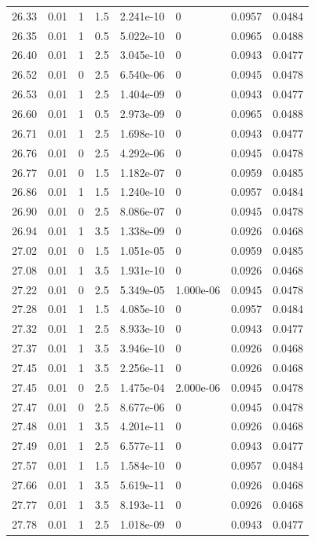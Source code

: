 \documentclass[preview]{standalone}
\begin{document}
{{{{{{{{{{{{\begin{tabular}{L{1.2cm}C{1.2cm} C{0.3cm}C{0.5cm} C{1.4cm}C{1.4cm} C{1.4cm}C{1.4cm}}
  26.33  &  0.01  & 1     & 1.5 &  2.241e-10  & 0  & 0.0957 &  0.0484   \\ 
  26.35  &  0.01  & 1     & 0.5 &  5.022e-10  & 0  & 0.0965 &  0.0488   \\ 
  26.40  &  0.01  & 1     & 2.5 &  3.045e-10  & 0  & 0.0943 &  0.0477   \\ 
  26.52  &  0.01  & 0     & 2.5 &  6.540e-06  & 0  & 0.0945 &  0.0478   \\ 
  26.53  &  0.01  & 1     & 2.5 &  1.404e-09  & 0  & 0.0943 &  0.0477   \\ 
  26.60  &  0.01  & 1     & 0.5 &  2.973e-09  & 0  & 0.0965 &  0.0488   \\ 
  26.71  &  0.01  & 1     & 2.5 &  1.698e-10  & 0  & 0.0943 &  0.0477   \\ 
  26.76  &  0.01  & 0     & 2.5 &  4.292e-06  & 0  & 0.0945 &  0.0478   \\ 
  26.77  &  0.01  & 0     & 1.5 &  1.182e-07  & 0  & 0.0959 &  0.0485   \\ 
  26.86  &  0.01  & 1     & 1.5 &  1.240e-10  & 0  & 0.0957 &  0.0484   \\ 
  26.90  &  0.01  & 0     & 2.5 &  8.086e-07  & 0  & 0.0945 &  0.0478   \\ 
  26.94  &  0.01  & 1     & 3.5 &  1.338e-09  & 0  & 0.0926 &  0.0468   \\ 
  27.02  &  0.01  & 0     & 1.5 &  1.051e-05  & 0  & 0.0959 &  0.0485   \\ 
  27.08  &  0.01  & 1     & 3.5 &  1.931e-10  & 0  & 0.0926 &  0.0468   \\ 
  27.22  &  0.01  & 0     & 2.5 &  5.349e-05  & 1.000e-06  & 0.0945 &  0.0478   \\ 
  27.28  &  0.01  & 1     & 1.5 &  4.085e-10  & 0  & 0.0957 &  0.0484   \\ 
  27.32  &  0.01  & 1     & 2.5 &  8.933e-10  & 0  & 0.0943 &  0.0477   \\ 
  27.37  &  0.01  & 1     & 3.5 &  3.946e-10  & 0  & 0.0926 &  0.0468   \\ 
  27.45  &  0.01  & 1     & 3.5 &  2.256e-11  & 0  & 0.0926 &  0.0468   \\ 
  27.45  &  0.01  & 0     & 2.5 &  1.475e-04  & 2.000e-06  & 0.0945 &  0.0478   \\ 
  27.47  &  0.01  & 0     & 2.5 &  8.677e-06  & 0  & 0.0945 &  0.0478   \\ 
  27.48  &  0.01  & 1     & 3.5 &  4.201e-11  & 0  & 0.0926 &  0.0468   \\ 
  27.49  &  0.01  & 1     & 2.5 &  6.577e-11  & 0  & 0.0943 &  0.0477   \\ 
  27.57  &  0.01  & 1     & 1.5 &  1.584e-10  & 0  & 0.0957 &  0.0484   \\ 
  27.66  &  0.01  & 1     & 3.5 &  5.619e-11  & 0  & 0.0926 &  0.0468   \\ 
  27.77  &  0.01  & 1     & 3.5 &  8.193e-11  & 0  & 0.0926 &  0.0468   \\ 
  27.78  &  0.01  & 1     & 2.5 &  1.018e-09  & 0  & 0.0943 &  0.0477   \\ 
\hline 
\end{tabular} 

}}}}}}}}}}}}
\end{document}
